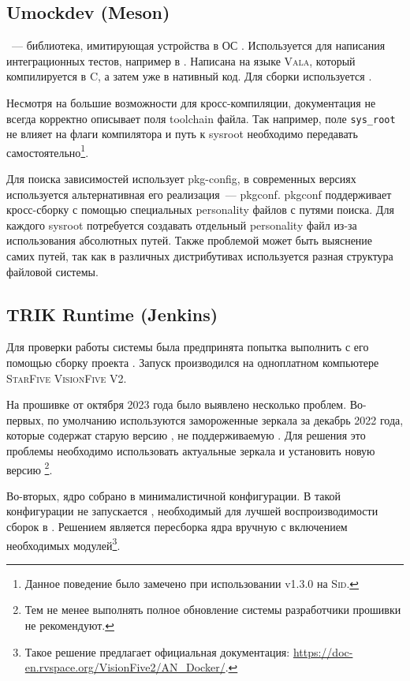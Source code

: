 \subsection{Umockdev (Meson)}

\umockdev{}~--- библиотека, имитирующая устройства в ОС \linux{}.
Используется для написания интеграционных тестов, например в \libusb{}.
Написана на языке \textsc{Vala}, который компилируется в \textsc{C}, а затем уже в нативный код.
Для сборки используется \meson{}.

Несмотря на большие возможности для кросс-компиляции, документация \meson{} не всегда корректно описывает поля toolchain файла.
Так например, поле \texttt{sys\_root} не влияет на флаги компилятора и путь к sysroot необходимо передавать самостоятельно\footnote{Данное поведение было замечено при использовании \meson{} v1.3.0 на \debian{} \textsc{Sid}.}.

Для поиска зависимостей \meson{} использует pkg-config, в современных версиях \linux{} используется альтернативная его реализация~--- pkgconf.
pkgconf поддерживает кросс-сборку с помощью специальных personality файлов с путями поиска.
Для каждого sysroot потребуется создавать отдельный personality файл из-за использования абсолютных путей.
Также проблемой может быть выяснение самих путей, так как в различных дистрибутивах используется разная структура файловой системы.

\subsection{TRIK Runtime (Jenkins)}

Для проверки работы \ci{} системы \jenkins{} была предпринята попытка выполнить с его помощью сборку проекта \trik{}.
Запуск производился на одноплатном компьютере \textsc{StarFive VisionFive V2}.

На прошивке от октября 2023 года было выявлено несколько проблем.
Во-первых, по умолчанию используются замороженные зеркала за декабрь 2022 года, которые содержат старую версию \java{}, не поддерживаемую \jenkins{}.
Для решения это проблемы необходимо использовать актуальные зеркала и установить новую версию \java{}\footnote{Тем не менее выполнять полное обновление системы разработчики прошивки не рекомендуют.}.

Во-вторых, ядро \linux{} собрано в минималистичной конфигурации.
В такой конфигурации не запускается \docker{}, необходимый для лучшей воспроизводимости сборок в \jenkins{}.
Решением является пересборка ядра вручную с включением необходимых модулей\footnote{Такое решение предлагает официальная документация: \url{https://doc-en.rvspace.org/VisionFive2/AN_Docker/}.}.

